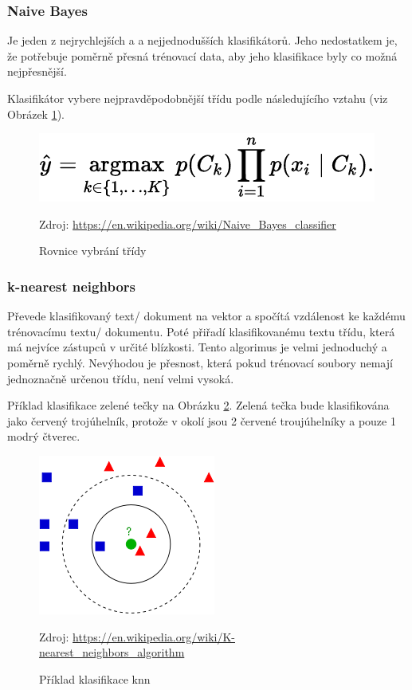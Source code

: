 \documentclass[12pt]{article}
\begin{document}
\subsubsection{Naive Bayes}
Je jeden z nejrychlejších a
a nejjednodušších klasifikátorů. Jeho nedostatkem je, že potřebuje
poměrně přesná trénovací data, aby jeho klasifikace byly co 
možná nejpřesnější.

Klasifikátor vybere nejpravděpodobnější třídu podle následujícího
vztahu (viz Obrázek \ref{fig:nb_class}).
\begin{figure}[H]
        \centering
        \includegraphics[]{img/nb_class.pdf}
        \caption{Rovnice vybrání třídy}
        Zdroj: \url{https://en.wikipedia.org/wiki/Naive\_Bayes\_classifier}
        \label{fig:nb_class}
\end{figure}
\subsubsection{k-nearest neighbors}
Převede klasifikovaný text/ dokument na vektor a spočítá vzdálenost ke 
každému trénovacímu textu/ dokumentu. Poté přiřadí klasifikovanému
textu třídu, která má nejvíce zástupců v určité blízkosti. Tento
algorimus je velmi jednoduchý a poměrně rychlý. Nevýhodou je přesnost,
která pokud trénovací soubory nemají jednoznačně určenou třídu, není
velmi vysoká.

Příklad klasifikace zelené tečky na Obrázku \ref{fig:knn}. Zelená 
tečka bude klasifikována jako červený trojúhelník, protože v okolí
jsou 2 červené troujúhelníky a pouze 1 modrý čtverec.
\begin{figure}[H]
        \centering
        \includegraphics[]{img/knn.png}
        \caption{Příklad klasifikace knn}
        Zdroj: \url{https://en.wikipedia.org/wiki/K-nearest\_neighbors\_algorithm}
        \label{fig:knn}
\end{figure}
%
%
\end{document}
